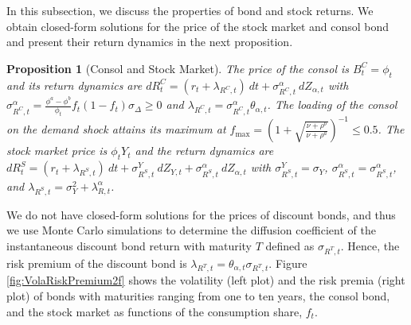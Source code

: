 \documentclass[preprint,11pt,authoryear]{elsarticle}
\theoremstyle{plain}
\newtheorem{prop}{Proposition}
\begin{document}
In this subsection, we discuss the properties of bond and stock returns. We obtain closed-form solutions for the price of the stock market and consol bond and present their return dynamics in the next proposition. 
\begin{prop}[Consol and Stock Market]\label{prop:stockmarket}
The price of the consol is $B_t^C=\phi_t$ and its return dynamics are $ d R^C_t = \left( r_t + \lambda_{R^C,t} \right) \: dt + \sigma_{R^C,t}^{\alpha} \: dZ_{\alpha,t}$ with $\sigma_{R^C,t}^{\alpha}    = \frac{\phi^a - \phi^b}{\phi_t}  f_t \left(1-f_t\right)  \sigma_{\Delta} \geq 0$ and  $\lambda_{R^C,t} = \sigma_{R^C,t}^{\alpha} \theta_{\alpha,t}$.
The loading of the consol on the demand shock attains its maximum at $f_{\text{max}}=\left(1+\sqrt{\frac{\nu+ \rho^b}{\nu+ \rho^a}}\right)^{-1}\leq 0.5$. The stock market price is $\phi_t Y_t$ and the return dynamics are $d R^S_t = \left( r_t + \lambda_{R^S,t} \right) \: dt + \sigma^Y_{R^S,t} \: dZ_{Y,t}+  \sigma_{R^S,t}^{\alpha} \: dZ_{\alpha,t}$ with $\sigma^Y_{R^S,t} = \sigma_Y$, $\sigma_{R^S,t}^{\alpha} = \sigma_{R^S,t}^{\alpha}$, and $\lambda_{R^S,t} = \sigma_Y^2  + \lambda^{\alpha}_{R,t}$.
\end{prop}
We do not have closed-form solutions for the prices of discount bonds, and thus we use Monte Carlo simulations to determine the diffusion coefficient of the instantaneous discount bond return with maturity $T$ defined as $\sigma_{R^T,t}$. Hence, the risk premium of the discount bond is $\lambda_{R^T,t} = \theta_{\alpha,t}\sigma_{R^T,t}$. Figure \ref{fig:VolaRiskPremium2f} shows the volatility (left plot) and the risk premia (right plot) of bonds with maturities ranging from one to ten years, the consol bond, and the stock market as functions of the consumption share, $f_t$. %
\end{document}
